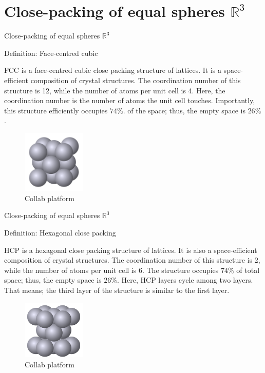 \documentclass[10pt]{beamer}
\begin{document}
\section{Close-packing of equal spheres
 $\mathbb{R}^3$}
\begin{frame}{Close-packing of equal spheres
 $\mathbb{R}^3$}

    \begin{block}{Definition: Face-centred cubic}
    
    FCC is a face-centred cubic close packing structure of lattices. It is a space-efficient composition of crystal structures. The coordination number of this structure is 12, while the number of atoms per unit cell is 4. Here, the coordination number is the number of atoms the unit cell touches. Importantly, this structure efficiently occupies $74\%$. of the space; thus, the empty space is $26\%$.
    
    \begin{figure}[t]
    \includegraphics[width=3cm]{hh1.png}
    \centering
    \caption{Collab platform}
    \end{figure}
    
    \end{block}
 

\end{frame}

\begin{frame}{Close-packing of equal spheres $\mathbb{R}^3$}
    \begin{block}{Definition: Hexagonal close packing}
    
    HCP is a hexagonal close packing structure of lattices. It is also a space-efficient composition of crystal structures.  The coordination number of this structure is 2, while the number of atoms per unit cell is $6$. The structure occupies $74\%$ of total space; thus, the empty space is  $26\%$. Here, HCP layers cycle among two layers. That means; the third layer of the structure is similar to the first layer.


    
    \begin{figure}[t]
    \includegraphics[width=3cm]{hh2.png}
    \centering
    \caption{Collab platform}
    \end{figure}
    \end{block}
\end{frame}
\end{document}
